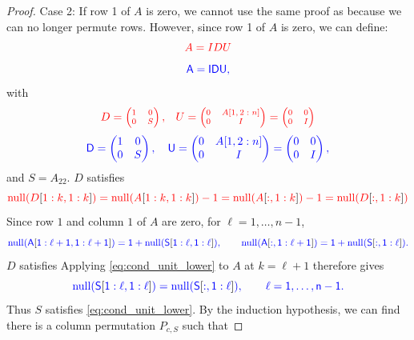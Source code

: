 \documentclass[10pt,twoside]{siamart1116}
\DeclareMathOperator{\nl}{null}
\numberwithin{theorem}{section}
\providecommand{\DIFadd}[1]{{\protect\color{blue} \sf #1}} %
\providecommand{\DIFdel}[1]{{\protect\color{red} \scriptsize #1}} %
\providecommand{\DIFaddbegin}{} %
\providecommand{\DIFaddend}{} %
\providecommand{\DIFdelbegin}{} %
\providecommand{\DIFdelend}{} %
\begin{document}
\begin{proof}
  Case 2: If row 1 of $A$ is zero, we cannot use the same proof as  because we can no longer permute rows. However, since row 1 of $A$ is zero, we can define:
  \DIFdelbegin \[
		\DIFdel{A = IDU
	}\]%
\DIFdelend \DIFaddbegin \[
    \DIFadd{A = IDU,
  }\]\DIFaddend 
  with
  \DIFdelbegin \[
		\DIFdel{D = \begin{pmatrix}
			1 & 0 \\
			0 & S
		\end{pmatrix}, \quad
		U = \begin{pmatrix}
			0 & A[1,2:n] \\
			0 & I
		\end{pmatrix} = \begin{pmatrix}
			0 & 0 \\
			0 & I
		\end{pmatrix}
	}\]%
\DIFdelend \DIFaddbegin \[
    \DIFadd{D =
    \begin{pmatrix}
      1 & 0 \\
      0 & S
    \end{pmatrix}, \quad
    U =
    \begin{pmatrix}
      0 & A[1,2:n] \\
      0 & I
    \end{pmatrix} =
    \begin{pmatrix}
      0 & 0 \\
      0 & I
    \end{pmatrix},
  }\]\DIFaddend 
  and $S=A_{22}$. \DIFdelbegin \DIFdel{$D$ satisfies
	}\[
		\DIFdel{\nl(D}[\DIFdel{1:k,1:k}]\DIFdel{) = \nl(A}[\DIFdel{1:k,1:k}]\DIFdel{) - 1
		= \nl(A}[\DIFdel{:,1:k}]\DIFdel{) - 1 = \nl(D}[\DIFdel{:,1:k}]\DIFdel{)
	}\]%
\DIFdelend \DIFaddbegin \DIFadd{Since row $1$ and column $1$ of $A$ are zero, for $\ell=1,\ldots,n-1$,
  }\[
    \DIFadd{\nl(A}[\DIFadd{1:\ell+1,1:\ell+1}]\DIFadd{)
    =
    1+\nl(S}[\DIFadd{1:\ell,1:\ell}]\DIFadd{),
    \qquad
    \nl(A}[\DIFadd{:,1:\ell+1}]\DIFadd{)
    =
    1+\nl(S}[\DIFadd{:,1:\ell}]\DIFadd{).
  }\]\DIFaddend 
  \DIFdelbegin \DIFdel{$D$ satisfies }%
\DIFdelend \DIFaddbegin \DIFadd{Applying }\cref{eq:cond_unit_lower} \DIFadd{to $A$ at $k=\ell+1$ therefore gives
  }\[
    \DIFadd{\nl(S}[\DIFadd{1:\ell,1:\ell}]\DIFadd{) = \nl(S}[\DIFadd{:,1:\ell}]\DIFadd{),
    \qquad \ell=1,\ldots,n-1.
  }\]
  \DIFadd{Thus $S$ satisfies }\cref{eq:cond_unit_lower}\DIFaddend . By the induction hypothesis, \DIFdelbegin \DIFdel{we can find }\DIFdelend \DIFaddbegin \DIFadd{there is }\DIFaddend a column permutation $P_{c,S}$ such that

\end{proof}
\end{document}
